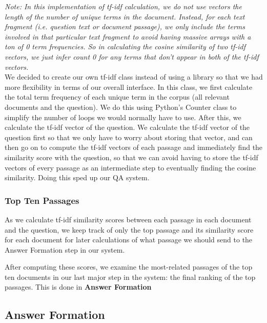 \documentclass{article}
\begin{document}
\textit{Note: In this implementation of tf-idf calculation, we do not use vectors the length of the number of unique terms in the document. Instead, for each text fragment (i.e. question text or document passage), we only include the terms involved in that particular text fragment to avoid having massive arrays with a ton of 0 term frequencies. So in calculating the cosine similarity of two tf-idf vectors, we just infer count 0 for any terms that don't appear in both of the tf-idf vectors.}\\

We decided to create our own tf-idf class instead of using a library so that we had more flexibility in terms of our overall interface. In this class, we first calculate the total term frequency of each unique term in the corpus (all relevant documents and the question). We do this using Python's Counter class to simplify the number of loops we would normally have to use. After this, we calculate the tf-idf vector of the question. We calculate the tf-idf vector of the question first so that we only have to worry about storing that vector, and can then go on to compute the tf-idf vectors of each passage and immediately find the similarity score with the question, so that we can avoid having to store the tf-idf vectors of every passage as an intermediate step to eventually finding the cosine similarity. Doing this sped up our QA system.

\subsubsection{Top Ten Passages}
As we calculate tf-idf similarity scores between each passage in each document and the question, we keep track of only the top passage and its similarity score for each document for later calculations of what passage we should send to the Answer Formation step in our system.

After computing these scores, we examine the most-related passages of the top ten documents in our last major step in the system: the final ranking of the top passages. This is done in \textbf{Answer Formation}

\subsection{Answer Formation}
\end{document}
